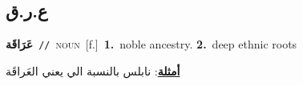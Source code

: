 \documentclass[10pt,a4paper,twoside]{article} %
\begin{document}
\begin{multicols}{2}
\vspace{-3mm}
\subsection*{\color{blue}\foreignlanguage{arabic}{ع.ر.ق}\color{blue}{}} 

{\setlength\topsep{0pt}\textbf{\foreignlanguage{arabic}{عَرَاقَة}}\ {\color{gray}\texttt{//}\color{black}}\ \textsc{noun}\ [f.]\ \textbf{1.}~noble ancestry.  \textbf{2.}~deep ethnic roots\  \begin{flushright}\color{gray}\foreignlanguage{arabic}{\textbf{\underline{\foreignlanguage{arabic}{أمثلة}}}: نابلس بالنسبة الي يعني العَراقَة}\end{flushright}\color{black}} \vspace{2mm}


\end{multicols}
\end{document}
